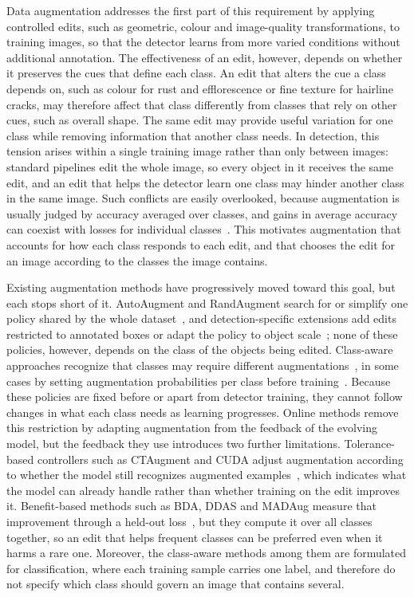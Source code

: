 \documentclass[conference]{IEEEtran}
\begin{document}
Data augmentation addresses the first part of this requirement by applying controlled edits, such as geometric, colour and image-quality transformations, to training images, so that the detector learns from more varied conditions without additional annotation. The effectiveness of an edit, however, depends on whether it preserves the cues that define each class. An edit that alters the cue a class depends on, such as colour for rust and efflorescence or fine texture for hairline cracks, may therefore affect that class differently from classes that rely on other cues, such as overall shape. The same edit may provide useful variation for one class while removing information that another class needs. In detection, this tension arises within a single training image rather than only between images: standard pipelines edit the whole image, so every object in it receives the same edit, and an edit that helps the detector learn one class may hinder another class in the same image. Such conflicts are easily overlooked, because augmentation is usually judged by accuracy averaged over classes, and gains in average accuracy can coexist with losses for individual classes~\cite{kirichenko2023}. This motivates augmentation that accounts for how each class responds to each edit, and that chooses the edit for an image according to the classes the image contains.

Existing augmentation methods have progressively moved toward this goal, but each stops short of it. AutoAugment and RandAugment search for or simplify one policy shared by the whole dataset~\cite{cubuk2019auto,cubuk2020rand}, and detection-specific extensions add edits restricted to annotated boxes or adapt the policy to object scale~\cite{zoph2020det,chen2021scale}; none of these policies, however, depends on the class of the objects being edited. Class-aware approaches recognize that classes may require different augmentations~\cite{tsuchiya2019,yoo2023,cheung2022adaaug}, in some cases by setting augmentation probabilities per class before training~\cite{rdd_detectron2}. Because these policies are fixed before or apart from detector training, they cannot follow changes in what each class needs as learning progresses. Online methods remove this restriction by adapting augmentation from the feedback of the evolving model, but the feedback they use introduces two further limitations. Tolerance-based controllers such as CTAugment and CUDA adjust augmentation according to whether the model still recognizes augmented examples~\cite{berthelot2020,ahn2023cuda}, which indicates what the model can already handle rather than whether training on the edit improves it. Benefit-based methods such as BDA, DDAS and MADAug measure that improvement through a held-out loss~\cite{lu2023bda,liu2021ddas,hou2023madaug}, but they compute it over all classes together, so an edit that helps frequent classes can be preferred even when it harms a rare one. Moreover, the class-aware methods among them are formulated for classification, where each training sample carries one label, and therefore do not specify which class should govern an image that contains several.
\end{document}
